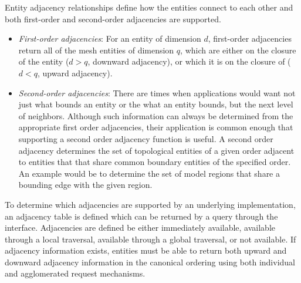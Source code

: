 Entity adjacency relationships define how the entities connect to
each other and both first-order and second-order adjacencies are
supported.
\begin{itemize}
\item {\it First-order adjacencies}: For an entity of dimension $d$,
first-order adjacencies return all of the mesh entities of dimension
$q$, which are either on the closure of the entity ($d > q$, downward
adjacency), or which it is on the closure of ($d < q$, upward
adjacency).  %

\item {\it Second-order adjacencies}: There are times when applications 
would want not just what bounds an entity or the what an entity
bounds, but the next level of neighbors. Although such information can
always be determined from the appropriate first order adjacencies,
their application is common enough that supporting a second order
adjacency function is useful. A second order adjacency determines the
set of topological entities of a given order adjacent to entities that
that share common boundary entities of the specified order. An example
would be to determine the set of model regions that share a bounding
edge with the given region.


\end{itemize}

To determine which adjacencies are supported by an underlying
implementation, an adjacency table is defined which can be
returned by a query through the interface.  Adjacencies are defined be
either immediately available, available through a local traversal,
available through a global traversal, or not available.  If adjacency
information exists, entities must be able to return both upward and
downward adjacency information in the canonical ordering using both
individual and agglomerated request mechanisms.

